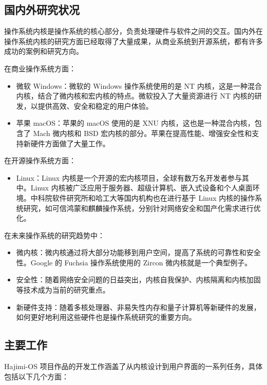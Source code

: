 \documentclass[UTF8]{article}
\begin{document}
\subsection{国内外研究状况}
操作系统内核是操作系统的核心部分，负责处理硬件与软件之间的交互。国内外在操作系统内核的研究方面已经取得了大量成果，从商业系统到开源系统，都有许多成功的案例和研究方向。

在商业操作系统方面：
\begin{itemize}
  \item 微软 Windows：微软的 Windows 操作系统使用的是 NT 内核，这是一种混合内核，结合了微内核和宏内核的特点。微软投入了大量资源进行 NT 内核的研发，以提供高效、安全和稳定的用户体验。
  \item 苹果 macOS：苹果的 macOS 使用的是 XNU 内核，这也是一种混合内核，包含了 Mach 微内核和 BSD 宏内核的部分。苹果在提高性能、增强安全性和支持新硬件方面做了大量工作。
\end{itemize}

在开源操作系统方面：
\begin{itemize}
  \item Linux：Linux 内核是一个开源的宏内核项目，全球有数万名开发者参与其中。Linux 内核被广泛应用于服务器、超级计算机、嵌入式设备和个人桌面环境。中科院软件研究所和哈工大等国内机构也在进行基于 Linux 内核的操作系统研究，如可信鸿蒙和麒麟操作系统，分别针对网络安全和国产化需求进行优化。
\end{itemize}

在未来操作系统的研究趋势中：
\begin{itemize}
  \item 微内核：微内核通过将大部分功能移到用户空间，提高了系统的可靠性和安全性。Google 的 Fuchsia 操作系统使用的 Zircon 微内核就是一个典型例子。
  \item 安全性：随着网络安全问题的日益突出，内核自我保护、内核隔离和内核加固等技术成为当前的研究重点。
  \item 新硬件支持：随着多核处理器、非易失性内存和量子计算机等新硬件的发展，如何更好地利用这些硬件也是操作系统研究的重要方向。
\end{itemize}

\subsection{主要工作}
Hajimi-OS 项目作品的开发工作涵盖了从内核设计到用户界面的一系列任务，具体包括以下几个方面：
\end{document}
